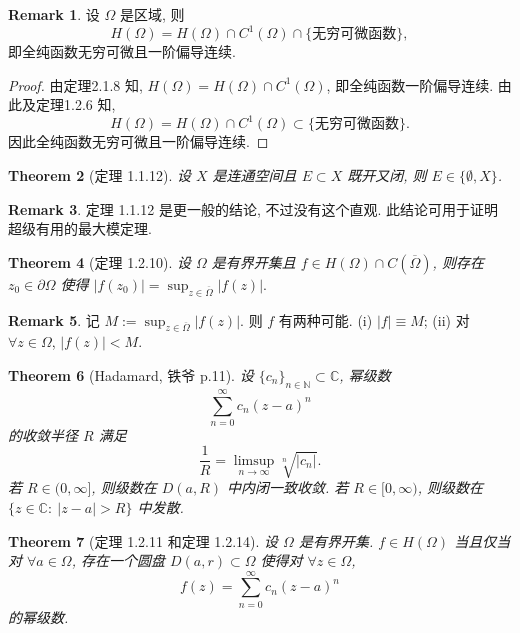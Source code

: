 \documentclass[a4paper,11pt]{article}
\newtheorem{theorem}{Theorem}[section]
\theoremstyle{definition}
\newtheorem{remark}[theorem]{Remark}
\begin{document}
\begin{CJK*}{UTF8}{gbsn}
\begin{remark}
    设 $ \Omega $ 是区域, 则 
    $$ 
        H(\Omega) = H(\Omega) \cap C^1(\Omega) \cap \{\text{无穷可微函数}\},
    $$
    即全纯函数无穷可微且一阶偏导连续.
\end{remark}

\begin{proof}
    由定理2.1.8 知, $ H(\Omega) = H(\Omega) \cap C^1(\Omega) $, 即全纯函数一阶偏导连续.
    由此及定理1.2.6 知,
    $$
        H(\Omega) = H(\Omega) \cap C^1(\Omega) \subset \{\text{无穷可微函数}\}.
    $$
    因此全纯函数无穷可微且一阶偏导连续.
\end{proof}

\begin{theorem}[定理 1.1.12]
    设 $ X $ 是连通空间且 $ E \subset X $ 既开又闭, 则 $ E \in \{\emptyset, X\} $.
\end{theorem}

\begin{remark}
    定理 1.1.12 是更一般的结论, 不过没有这个直观. 此结论可用于证明超级有用的最大模定理.
\end{remark}


\begin{theorem}[定理 1.2.10]
    设 $ \Omega $ 是有界开集且 $ f \in H(\Omega) \cap C(\overline{\Omega}) $, 
    则存在 $ z_0 \in \partial \Omega $ 使得
    $
        |f(z_0)| = \sup_{z \in \overline{\Omega}} |f(z)|.
    $
\end{theorem}

\begin{remark}
    记
    $
        M := \sup_{z \in \overline{\Omega}} |f(z)|.
    $
    则 $ f $ 有两种可能. (i) $ |f| \equiv M $; (ii) 对 $ \forall z \in \Omega $, $ |f(z)| < M $.
\end{remark}

\begin{theorem}[Hadamard, 铁爷 p.11]
    设 $ \{c_n\}_{n \in \mathbb{N}} \subset \mathbb{C} $, 幂级数
    $$
        \sum_{n=0}^\infty c_n (z - a)^n
    $$
    的收敛半径 $ R $ 满足
    $$
        \frac{1}{R} = \limsup_{n \to \infty} \sqrt[n]{|c_n|}.
    $$
    若 $ R \in (0, \infty] $, 则级数在 $ D(a, R) $ 中内闭一致收敛.
    若 $ R \in [0, \infty) $, 则级数在 $ \{z \in \mathbb{C} :\ |z - a| > R\} $ 中发散.
\end{theorem}

\begin{theorem}[定理 1.2.11 和定理 1.2.14]
    设 $ \Omega $ 是有界开集. 
    $ f \in H(\Omega) $ 当且仅当对 $ \forall a \in \Omega $, 存在一个圆盘 $ D(a, r) \subset \Omega $ 
    使得对 $ \forall z \in \Omega $,
    $$
        f(z) = \sum_{n=0}^\infty c_n (z - a)^n
    $$
    的幂级数.
\end{theorem}


\end{CJK*}
\end{document}
